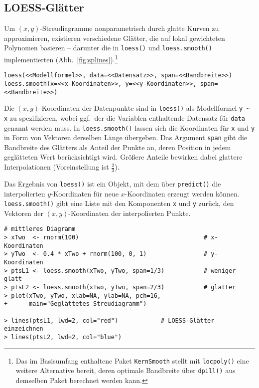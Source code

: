 \subsection{LOESS-Glätter}
\label{sec:loess}

Um $(x, y)$-Streudiagramme nonparametrisch durch glatte Kurven zu approximieren, existieren verschiedene Glätter, die auf lokal gewichteten Polynomen basieren -- darunter die in \lstinline!loess()! und \lstinline!loess.smooth()! implementierten (Abb.\ \ref{fig:splines}).\footnote{Das im Basisumfang enthaltene Paket \lstinline!KernSmooth! \cite{Wand2013} stellt mit \lstinline!locpoly()! eine weitere Alternative bereit, deren optimale Bandbreite über \lstinline!dpill()! aus demselben Paket berechnet werden kann.}
\begin{lstlisting}
loess(<<Modellformel>>, data=<<Datensatz>>, span=<<Bandbreite>>)
loess.smooth(x=<<x-Koordinaten>>, y=<<y-Koordinaten>>, span=<<Bandbreite>>)
\end{lstlisting}

Die $(x, y)$-Koordinaten der Datenpunkte sind in \lstinline!loess()! als Modellformel \lstinline!y ~ x! zu spezifizieren, wobei ggf.\ der die Variablen enthaltende Datensatz für \lstinline!data! genannt werden muss. In \lstinline!loess.smooth()! lassen sich die Koordinaten für \lstinline!x! und \lstinline!y! in Form von Vektoren derselben Länge übergeben. Das Argument \lstinline!span! gibt die Bandbreite des Glätters als Anteil der Punkte an, deren Position in jedem geglätteten Wert berücksichtigt wird. Größere Anteile bewirken dabei glattere Interpolationen (Voreinstellung ist $\frac{2}{3}$).

Das Ergebnis von \lstinline!loess()! ist ein Objekt, mit dem über \lstinline!predict()! die interpolierten $y$-Koordinaten für neue $x$-Koordinaten erzeugt werden können. \lstinline!loess.smooth()! gibt eine Liste mit den Komponenten \lstinline!x! und \lstinline!y! zurück, den Vektoren der $(x, y)$-Koordinaten der interpolierten Punkte.
\begin{lstlisting}
# mittleres Diagramm
> xTwo  <- rnorm(100)                                   # x-Koordinaten
> yTwo  <- 0.4 * xTwo + rnorm(100, 0, 1)                # y-Koordinaten
> ptsL1 <- loess.smooth(xTwo, yTwo, span=1/3)           # weniger glatt
> ptsL2 <- loess.smooth(xTwo, yTwo, span=2/3)           # glatter
> plot(xTwo, yTwo, xlab=NA, ylab=NA, pch=16,
+      main="Geglättetes Streudiagramm")

> lines(ptsL1, lwd=2, col="red")            # LOESS-Glätter einzeichnen
> lines(ptsL2, lwd=2, col="blue")
\end{lstlisting}

